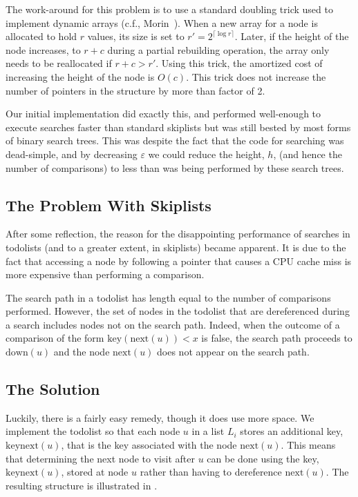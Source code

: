 \documentclass{patmorin}
\newcommand{\eps}{\varepsilon}
\begin{document}
The work-around for this problem is to use a standard
doubling trick used to implement dynamic arrays (c.f.,
Morin~\cite[Section~2.1.2]{morin:open}). When a new array for a node
is allocated to hold $r$ values, its size is set to $r'=2^{\lceil\log
r\rceil}$.  Later, if the height of the node increases, to $r+c$ during
a partial rebuilding operation, the array only needs to be reallocated
if $r+c > r'$.  Using this trick, the amortized
cost of increasing the height of the node is $O(c)$.  This trick does not
increase the number of pointers in the structure by more than factor of 2.

Our initial implementation did exactly this, and performed well-enough
to execute searches faster than standard skiplists but was still bested
by most forms of binary search trees.  This was despite the fact that
the code for searching was dead-simple, and by decreasing $\eps$ we
could reduce the height, $h$, (and hence the number of comparisons)
to less than was being performed by these search trees.

\subsection{The Problem With Skiplists}

After some reflection, the reason for the disappointing performance of
searches in todolists (and to a greater extent, in skiplists) became
apparent. It is due to the fact that accessing a node by following a
pointer that causes a CPU cache miss is more expensive than performing
a comparison.

The search path in a todolist has length equal to the number of
comparisons performed.  However, the set of nodes in the todolist
that are dereferenced during a search includes nodes not on the
search path. Indeed, when the outcome of a comparison of the form
$\mathrm{key}(\mathrm{next}(u)) < x$ is false, the search path proceeds
to $\mathrm{down}(u)$ and the node $\mathrm{next}(u)$ does not appear on
the search path.

\subsection{The Solution}

Luckily, there is a fairly easy remedy, though it does use more space.
We implement the todolist so that each node $u$ in a list $L_i$ stores an
additional key, $\mathrm{keynext}(u)$, that is the key associated with
the node $\mathrm{next}(u)$.  This means that determining the next node
to visit after $u$ can be done using the key, $\mathrm{keynext}(u)$, stored
at node $u$ rather than having to dereference $\mathrm{next}(u)$. The
resulting structure is illustrated in .
\end{document}
